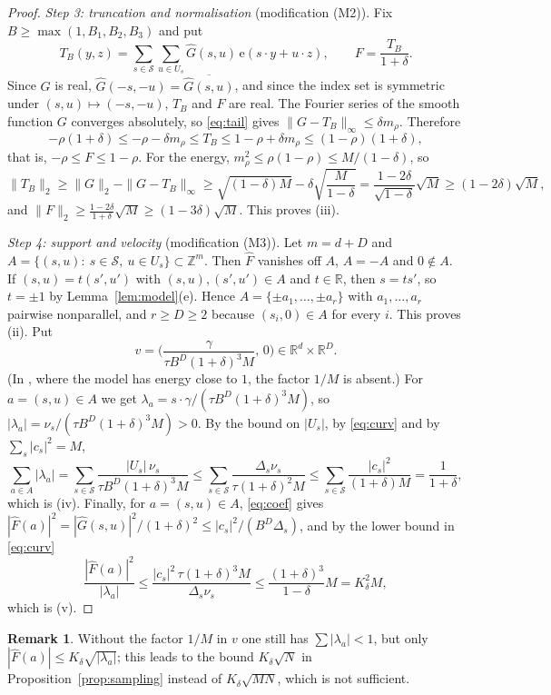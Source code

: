 \documentclass[11pt,reqno]{amsart}
\theoremstyle{definition}
\newtheorem{remark}[theorem]{Remark}
\newcommand{\Z}{\mathbb{Z}}
\newcommand{\R}{\mathbb{R}}
\newcommand{\e}{\mathrm{e}}
\newcommand{\cS}{\mathcal{S}}
\begin{document}
\begin{proof}
\emph{Step 3: truncation and normalisation} (modification (M2)). Fix $B\ge\max(1,B_1,B_2,B_3)$ and put
\[
T_B(y,z)=\sum_{s\in\cS}\sum_{u\in U_s}\widehat G(s,u)\,\e(s\cdot y+u\cdot z),\qquad F=\frac{T_B}{1+\delta}.
\]
Since $G$ is real, $\widehat G(-s,-u)=\overline{\widehat G(s,u)}$, and since the index set is symmetric under $(s,u)\mapsto(-s,-u)$, $T_B$ and $F$ are real. The Fourier series of the smooth function $G$ converges absolutely, so \eqref{eq:tail} gives $\|G-T_B\|_\infty\le\delta m_\rho$. Therefore
\[
-\rho(1+\delta)\le-\rho-\delta m_\rho\le T_B\le1-\rho+\delta m_\rho\le(1-\rho)(1+\delta),
\]
that is, $-\rho\le F\le1-\rho$. For the energy, $m_\rho^2\le\rho(1-\rho)\le M/(1-\delta)$, so
\[
\|T_B\|_2\ge\|G\|_2-\|G-T_B\|_\infty\ge\sqrt{(1-\delta)M}-\delta\sqrt{\frac M{1-\delta}}=\frac{1-2\delta}{\sqrt{1-\delta}}\sqrt M\ge(1-2\delta)\sqrt M,
\]
and $\|F\|_2\ge\frac{1-2\delta}{1+\delta}\sqrt M\ge(1-3\delta)\sqrt M$. This proves (iii).

\emph{Step 4: support and velocity} (modification (M3)). Let $m=d+D$ and $A=\{(s,u):\ s\in\cS,\ u\in U_s\}\subset\Z^m$. Then $\widehat F$ vanishes off $A$, $A=-A$ and $0\notin A$. If $(s,u)=t(s',u')$ with $(s,u),(s',u')\in A$ and $t\in\R$, then $s=ts'$, so $t=\pm1$ by Lemma~\ref{lem:model}(e). Hence $A=\{\pm a_1,\dots,\pm a_r\}$ with $a_1,\dots,a_r$ pairwise nonparallel, and $r\ge D\ge2$ because $(s_i,0)\in A$ for every $i$. This proves (ii). Put
\[
v=\Big(\frac{\gamma}{\tau B^D(1+\delta)^3M},\,0\Big)\in\R^d\times\R^D .
\]
(In \cite{AMM}, where the model has energy close to $1$, the factor $1/M$ is absent.) For $a=(s,u)\in A$ we get $\lambda_a=s\cdot\gamma/(\tau B^D(1+\delta)^3M)$, so $|\lambda_a|=\nu_s/(\tau B^D(1+\delta)^3M)>0$. By the bound on $|U_s|$, by \eqref{eq:curv} and by $\sum_s|c_s|^2=M$,
\[
\sum_{a\in A}|\lambda_a|=\sum_{s\in\cS}\frac{|U_s|\,\nu_s}{\tau B^D(1+\delta)^3M}\le\sum_{s\in\cS}\frac{\Delta_s\nu_s}{\tau(1+\delta)^2M}\le\sum_{s\in\cS}\frac{|c_s|^2}{(1+\delta)M}=\frac1{1+\delta},
\]
which is (iv). Finally, for $a=(s,u)\in A$, \eqref{eq:coef} gives $|\widehat F(a)|^2=|\widehat G(s,u)|^2/(1+\delta)^2\le|c_s|^2/(B^D\Delta_s)$, and by the lower bound in \eqref{eq:curv}
\[
\frac{|\widehat F(a)|^2}{|\lambda_a|}\le\frac{|c_s|^2\,\tau(1+\delta)^3M}{\Delta_s\nu_s}\le\frac{(1+\delta)^3}{1-\delta}M=K_\delta^2M,
\]
which is (v).
\end{proof}

\begin{remark}
Without the factor $1/M$ in $v$ one still has $\sum|\lambda_a|<1$, but only $|\widehat F(a)|\le K_\delta\sqrt{|\lambda_a|}$; this leads to the bound $K_\delta\sqrt N$ in Proposition~\ref{prop:sampling} instead of $K_\delta\sqrt{MN}$, which is not sufficient.
\end{remark}
\end{document}
